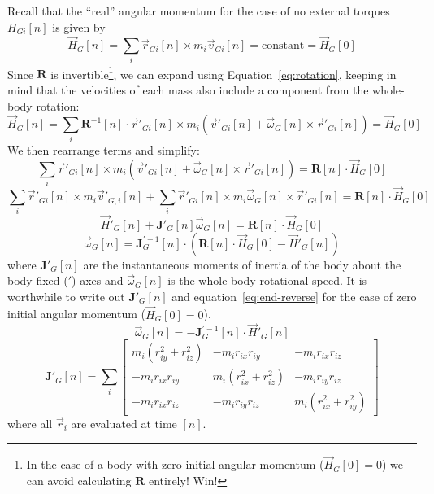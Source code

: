 \documentclass{amsart}
\begin{document}
Recall that the ``real'' angular momentum for the case of no external torques $H_{Gi}[n]$ is given by
\begin{equation}
\vec{H}_{G}[n] = \sum_i \vec{r}_{Gi}[n] \times m_i \vec{v}_{Gi}[n] = \mbox{constant} = \vec{H}_G[0]
\end{equation}
Since $\mathbf{R}$ is invertible\footnote{In the case of a body with zero initial angular momentum ($\vec{H}_G[0] = 0$) we can avoid calculating $\mathbf{R}$ entirely! Win!}, we can expand using Equation~\ref{eq:rotation}, keeping in mind that the velocities of each mass also include a component from the whole-body rotation:
\begin{equation}
\vec{H}_{G}[n] = \sum_i \mathbf{R}^{-1}[n] \cdot \vec{r}'_{Gi}[n] \times m_i (\vec{v}'_{Gi}[n] + \vec\omega_G[n] \times \vec{r}'_{Gi}[n] ) = \vec{H}_G[0]
\end{equation}
We then rearrange terms and simplify: 
\begin{equation}
\sum_i \vec{r}'_{Gi}[n] \times m_i (\vec{v}'_{Gi}[n] + \vec\omega_G[n] \times \vec{r}'_{Gi}[n]) = 
\mathbf{R}[n] \cdot \vec{H}_G[0] 
\end{equation}
\begin{equation}
\sum_i \vec{r}'_{Gi}[n] \times m_i \vec{v}'_{G,i}[n] + 
\sum_i \vec{r}'_{Gi}[n] \times m_i \vec\omega_G[n] \times \vec{r}'_{Gi}[n] = 
\mathbf{R}[n] \cdot \vec{H}_G[0] 
\end{equation}
\begin{equation}
\vec{H}'_G[n] +
\mathbf{J}'_G[n] \vec\omega_G[n] = \mathbf{R}[n] \cdot \vec{H}_G[0] 
\end{equation}
\begin{equation}
\vec\omega_G[n] = 
\mathbf{J}_G^{\prime -1}[n] \cdot (\mathbf{R}[n] \cdot \vec{H}_G[0]
-\vec{H}'_G[n]) 
\label{eq:end-reverse}
\end{equation}
where $\mathbf{J}'_G[n]$ are the instantaneous moments of inertia of the body about the body-fixed ($'$) axes and $\vec\omega_G[n]$ is the whole-body rotational speed. It is worthwhile to write out $\mathbf{J}'_G[n]$ and equation~\ref{eq:end-reverse} for the case of zero initial angular momentum ($\vec{H}_G[0]=0$). 
\begin{equation}
\vec\omega_G[n] = 
- \mathbf{J}_G^{\prime -1}[n] \cdot 
\vec{H}'_G[n] 
\label{eq:end-reverse1}
\end{equation}
\begin{equation}
\mathbf{J}'_G[n] = 
\sum_i \begin{bmatrix}
m_i (r_{iy}^2+r_{iz}^2) & -m_i r_{ix} r_{iy} & -m_i r_{ix} r_{iz} \\
-m_i r_{ix} r_{iy} & m_i (r_{ix}^2+r_{iz}^2) & -m_i r_{iy} r_{iz} \\
-m_i r_{ix} r_{iz} & -m_i r_{iy} r_{iz} & m_i (r_{ix}^2+r_{iy}^2) 
\end{bmatrix}
\label{eq:Jn}
\end{equation}
where all $\vec{r}_i$ are evaluated at time $[n]$.  
\end{document}
